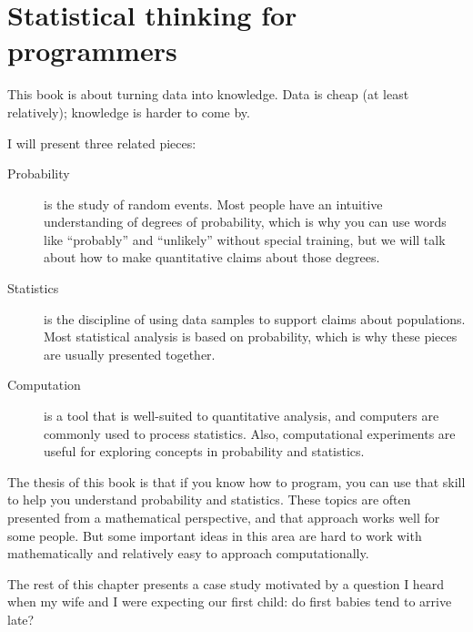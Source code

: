 \documentclass[12pt]{book}
\begin{document}
\mainmatter


\chapter{Statistical thinking for programmers}
\label{intro}

This book is about turning data into knowledge.  Data is cheap (at
least relatively); knowledge is harder to come by.

I will present three related pieces:

\begin{description}

\item[Probability] is the study of random events.  Most people have an
  intuitive understanding of degrees of probability, which is why you
  can use words like ``probably'' and ``unlikely'' without special
  training, but we will talk about how to make quantitative claims
  about those degrees.


\item[Statistics] is the discipline of using data samples to support
  claims about populations.  Most statistical analysis is based on
  probability, which is why these pieces are usually presented
  together.


\item[Computation] is a tool that is well-suited to quantitative
  analysis, and computers are commonly used to process statistics.
  Also, computational experiments
  are useful for exploring concepts in probability and statistics.


\end{description}

The thesis of this book is that if you know how to program, you can
use that skill to help you understand probability and statistics.
These topics are often presented from a mathematical perspective, and
that approach works well for some people.  But some important ideas
in this area are hard to work with mathematically and relatively
easy to approach computationally.

The rest of this chapter presents a case study motivated by a question
I heard when my wife and I were expecting our first child: do first
babies tend to arrive late?

\end{document}
